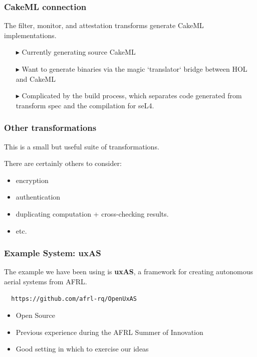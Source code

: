\documentclass{beamer}
\begin{document}
\begin{frame}\frametitle{CakeML connection}

  The filter, monitor, and attestation transforms generate CakeML implementations.

\begin{itemize}
 \item [$\blacktriangleright$] Currently generating source CakeML
 \item [$\blacktriangleright$] Want to generate binaries via the magic `translator` bridge between HOL and CakeML
 \item [$\blacktriangleright$] Complicated by the build process, which
   separates code generated from transform spec and the compilation
   for seL4.

\end{itemize}

\end{frame}


\begin{frame}\frametitle{Other transformations}
  This is a small but useful suite of transformations.

  There are certainly others to consider:
  \begin{itemize}
  \item encryption
  \item authentication
  \item duplicating computation + cross-checking results.
  \item etc.
  \end{itemize}

\end{frame}

\begin{frame}[fragile]\frametitle{Example System: uxAS}

 The example we have been using is \textbf{uxAS}, a framework for
 creating autonomous aerial systems from AFRL.

\begin{verbatim}
  https://github.com/afrl-rq/OpenUxAS
\end{verbatim}

\begin{itemize}
\item Open Source
\item Previous experience during the AFRL Summer of Innovation
\item Good setting in which to exercise our ideas
\end{itemize}

\end{frame}
\end{document}
